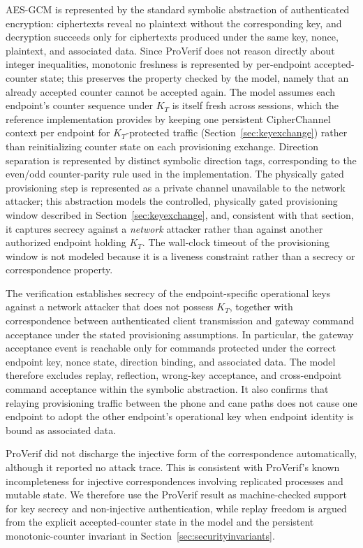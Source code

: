 \documentclass[journal]{IEEEtran}
\begin{document}
AES-GCM is represented by the standard symbolic abstraction of authenticated encryption: ciphertexts reveal no plaintext without the corresponding key, and decryption succeeds only for ciphertexts produced under the same key, nonce, plaintext, and associated data. Since ProVerif does not reason directly about integer inequalities, monotonic freshness is represented by per-endpoint accepted-counter state; this preserves the property checked by the model, namely that an already accepted counter cannot be accepted again. The model assumes each endpoint's counter sequence under $K_T$ is itself fresh across sessions, which the reference implementation provides by keeping one persistent CipherChannel context per endpoint for $K_T$-protected traffic (Section~\ref{sec:keyexchange}) rather than reinitializing counter state on each provisioning exchange. Direction separation is represented by distinct symbolic direction tags, corresponding to the even/odd counter-parity rule used in the implementation. The physically gated provisioning step is represented as a private channel unavailable to the network attacker; this abstraction models the controlled, physically gated provisioning window described in Section~\ref{sec:keyexchange}, and, consistent with that section, it captures secrecy against a \emph{network} attacker rather than against another authorized endpoint holding $K_T$. The wall-clock timeout of the provisioning window is not modeled because it is a liveness constraint rather than a secrecy or correspondence property.

The verification establishes secrecy of the endpoint-specific operational keys against a network attacker that does not possess \(K_T\), together with correspondence between authenticated client transmission and gateway command acceptance under the stated provisioning assumptions. In particular, the gateway acceptance event is reachable only for commands protected under the correct endpoint key, nonce state, direction binding, and associated data. The model therefore excludes replay, reflection, wrong-key acceptance, and cross-endpoint command acceptance within the symbolic abstraction. It also confirms that relaying provisioning traffic between the phone and cane paths does not cause one endpoint to adopt the other endpoint's operational key when endpoint identity is bound as associated data.

ProVerif did not discharge the injective form of the correspondence automatically, although it reported no attack trace. This is consistent with ProVerif's known incompleteness for injective correspondences involving replicated processes and mutable state. We therefore use the ProVerif result as machine-checked support for key secrecy and non-injective authentication, while replay freedom is argued from the explicit accepted-counter state in the model and the persistent monotonic-counter invariant in Section~\ref{sec:securityinvariants}.
\end{document}
